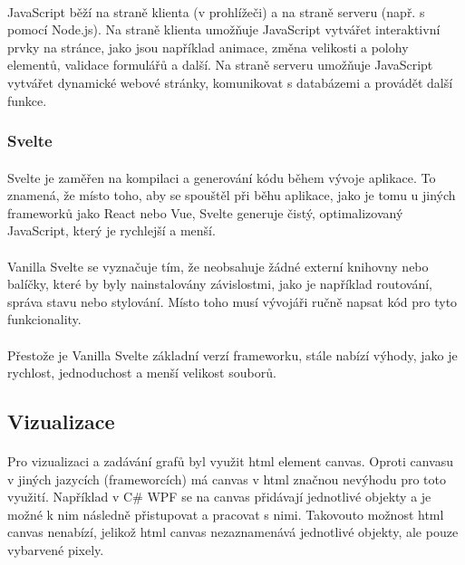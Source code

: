 \documentclass[12pt, titlepage, a4paper]{article}
\begin{document}
\paragraph{}
JavaScript běží na straně klienta (v prohlížeči) a na straně serveru (např. s pomocí Node.js). Na
straně klienta umožňuje JavaScript vytvářet interaktivní prvky na stránce, jako jsou například
animace, změna velikosti a polohy elementů, validace formulářů a další. Na straně serveru umožňuje
JavaScript vytvářet dynamické webové stránky, komunikovat s databázemi a provádět další funkce.

\subsubsection{Svelte}
\paragraph{}
Svelte je zaměřen na kompilaci a generování kódu během vývoje aplikace. To znamená, že místo toho,
aby se spouštěl při běhu aplikace, jako je tomu u jiných frameworků jako React nebo Vue, Svelte
generuje čistý, optimalizovaný JavaScript, který je rychlejší a menší.
\paragraph{}
Vanilla Svelte se vyznačuje tím, že neobsahuje žádné externí knihovny nebo balíčky, které by
byly nainstalovány závislostmi, jako je například routování, správa stavu nebo stylování. Místo
toho musí vývojáři ručně napsat kód pro tyto funkcionality.
\paragraph{}
Přestože je Vanilla Svelte základní verzí frameworku, stále nabízí výhody, jako je rychlost,
jednoduchost a menší velikost souborů.

\subsection{Vizualizace}
\paragraph{}
Pro vizualizaci a zadávání grafů byl využit html element canvas. Oproti
canvasu v jiných jazycích (frameworcích) má canvas v html značnou nevýhodu
pro toto využití. Například v C\# WPF se na canvas přidávají jednotlivé objekty
a je možné k nim následně přistupovat a pracovat s nimi. Takovouto možnost html
canvas nenabízí, jelikož html canvas nezaznamenává jednotlivé objekty, ale pouze
vybarvené pixely. \par
\end{document}
